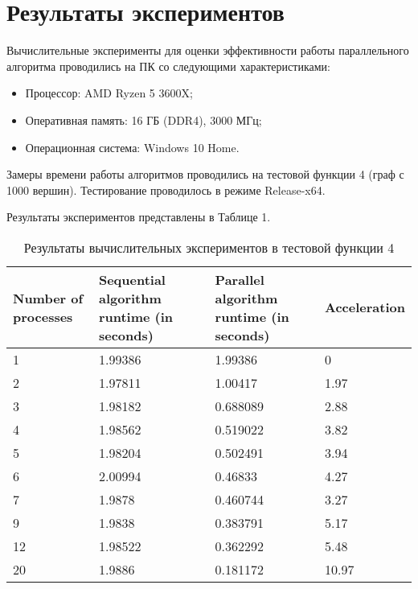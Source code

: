 \documentclass{report}
\begin{document}
\newpage

\section*{Результаты экспериментов}
Вычислительные эксперименты для оценки эффективности работы параллельного алгоритма проводились на ПК со следующими характеристиками:
\begin{itemize}
\item Процессор: AMD Ryzen 5 3600X;
\item Оперативная память: 16 ГБ (DDR4), 3000 МГц;
\item Операционная система: Windows 10 Home.
\end{itemize}

\par Замеры времени работы алгоритмов проводились на тестовой функции 4 (граф с 1000 вершин). Тестирование проводилось в режиме Release-x64.

\par Результаты экспериментов представлены в Таблице 1.

\begin{table}[!h]
\caption{Результаты вычислительных экспериментов в тестовой функции 4}
\centering
\begin{tabular}{| p{2cm} | p{2cm} | p{2cm} | p{2cm} |}
\hline
Number of processes & Sequential algorithm runtime (in seconds) & Parallel algorithm runtime (in seconds) & Acceleration  \\[5pt]
\hline
1        &1.99386         &1.99386      &0        \\
2        &1.97811         &1.00417      &1.97        \\
3        &1.98182         &0.688089      &2.88        \\
4        &1.98562         &0.519022      &3.82        \\
5        &1.98204         &0.502491      &3.94       \\
6        &2.00994         &0.46833      &4.27        \\
7        &1.9878         &0.460744      &3.27        \\
9        &1.9838         &0.383791      &5.17 	    \\
12        &1.98522         &0.362292      &5.48 	  \\
20        &1.9886         &0.181172      &10.97 	  \\
\hline
\end{tabular}
\end{table}
\end{document}
